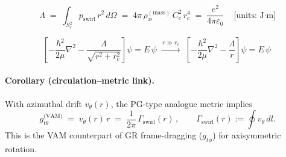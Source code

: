 \documentclass[11pt]{article}
\begin{document}

    \[
        \boxed{\, \Lambda \;=\; \int_{S_r^2} p_{\text{swirl}}\,r^2\,d\Omega
        \;=\; 4\pi\,\rho_{\text{\ae}}^{(\text{mass})}\,C_e^2\,r_c^4
        \;=\; \frac{e^2}{4\pi\varepsilon_0} \,}
        \quad\text{[units: J·m]}
    \]

    \[
        \boxed{\,
        \left[-\frac{\hbar^2}{2\mu}\nabla^2 - \frac{\Lambda}{\sqrt{r^2+r_c^2}}\right]\psi = E\,\psi
        \;\xrightarrow{\,r\gg r_c\,}\;
        \left[-\frac{\hbar^2}{2\mu}\nabla^2 - \frac{\Lambda}{r}\right]\psi = E\,\psi
        \,}
    \]
    \paragraph*{Corollary (circulation–metric link).}
    With azimuthal drift $v_\theta(r)$, the PG-type analogue metric implies
    \[
        \boxed{\, g_{t\theta}^{\text{(VAM)}} \;=\; v_\theta(r)\,r \;=\; \frac{1}{2\pi}\,\Gamma_{\text{swirl}}(r) \,},
        \qquad \Gamma_{\text{swirl}}(r) := \oint v_\theta\,dl.
    \]
    This is the VAM counterpart of GR frame-dragging ($g_{t\phi}$) for axisymmetric rotation.


    \usepackage{amsmath, amssymb}
    \usepackage{siunitx}
    \usepackage{hyperref}
    \usepackage{geometry}
    \usepackage{physics}
    \usepackage{bm}
    \usepackage{upgreek}
    \usepackage{graphicx}
    \geometry{margin=1in}

    \newcommand{\aeFluid}{\rho_{\text{\ae}}^{(\text{fluid})}}
    \newcommand{\aeMass}{\rho_{\text{\ae}}^{(\text{mass})}}
    \newcommand{\aeEnergy}{\rho_{\text{\ae}}^{(\text{energy})}}
    \newcommand{\Ce}{C_e}
    \newcommand{\rc}{r_c}
    \newcommand{\tp}{t_p}
    \newcommand{\aeforce}{F_{\text{\ae}}^{\max}}
    \newcommand{\Lag}{\mathcal{L}}
    \newcommand{\Ham}{\mathcal{H}}
    \newcommand{\Om}{\Omega_{\text{swirl}}}
    \newcommand{\Lam}{\Lambda_{\text{swirl}}}
    \newcommand{\phig}{\varphi}
\end{document}
